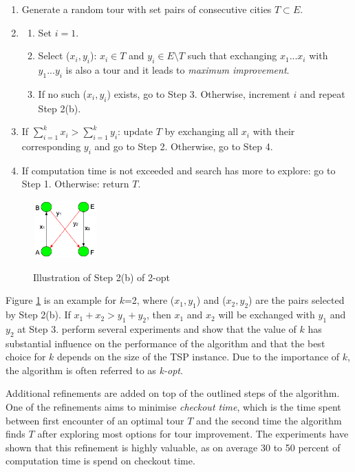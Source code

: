 \documentclass[a4paper,12pt]{article}
\begin{document}
\begin{enumerate}
\item Generate a random tour with set pairs of consecutive cities $T \subset E$.
\item 
\begin{enumerate}
\item Set $i = 1$.
\item Select ($x_{i}, y_{i}$): $x_{i} \in T$ and $y_{i} \in E\setminus T$ such that exchanging $x_{1}...x_{i}$ with $y_{1}...y_{i}$ is also a tour and it leads to \textit{maximum improvement}.
\item If no such ($x_{i}, y_{i}$) exists, go to Step 3. Otherwise, increment $i$ and repeat Step 2(b).
\end{enumerate}
\item If $\sum_{i=1}^{k} x_{i} > \sum_{i=1}^{k} y_{i}$: update $T$ by exchanging all $x_{i}$ with their corresponding $y_{i}$ and go to Step 2. Otherwise, go to Step 4. %
\item If computation time is not exceeded and search has more to explore: go to Step 1. Otherwise: return $T$.
\end{enumerate}

\begin{figure}
\centering
\includegraphics[height = 2.2cm, width = 2.5cm]{images/2opt.png}
\label{fig:2opt}
\caption{Illustration of Step 2(b) of 2-opt}
\end{figure}

Figure \ref{fig:2opt} is an example for $k$=2, where ($x_{1},y_{1}$) and ($x_{2},y_{2}$) are the pairs selected by Step 2(b). If $x_{1} + x_{2} > y_{1} + y_{2}$, then $x_{1}$ and $x_{2}$ will be exchanged with $y_{1}$ and $y_{2}$ at Step 3. \citep{LinKernighan73} perform several experiments and show that the value of $k$ has substantial influence on the performance of the algorithm and that the best choice for $k$ depends on the size of the TSP instance. Due to the importance of $k$, the algorithm is often referred to as \textit{k-opt}.

Additional refinements are added on top of the outlined steps of the algorithm. One of the refinements aims to minimise \textit{ checkout time}, which is the time spent between first encounter of an optimal tour $T$ and the second time the algorithm finds $T$ after exploring most options for tour improvement. The experiments have shown that this refinement is highly valuable, as on average 30 to 50 percent of computation time is spend on checkout time.
\end{document}

